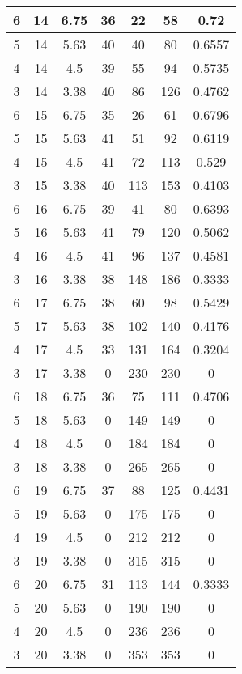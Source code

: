 \documentclass[letterpaper, 12pt]{article}
\begin{document}
\begin{longtable}{|c|c|c|c|c|c|c|}
6 & 14 & 6.75 & 36 & 22 & 58 & 0.72 \\
\hline
5 & 14 & 5.63 & 40 & 40 & 80 & 0.6557 \\
\hline
4 & 14 & 4.5 & 39 & 55 & 94 & 0.5735 \\
\hline
3 & 14 & 3.38 & 40 & 86 & 126 & 0.4762 \\
\hline
6 & 15 & 6.75 & 35 & 26 & 61 & 0.6796 \\
\hline
5 & 15 & 5.63 & 41 & 51 & 92 & 0.6119 \\
\hline
4 & 15 & 4.5 & 41 & 72 & 113 & 0.529 \\
\hline
3 & 15 & 3.38 & 40 & 113 & 153 & 0.4103 \\
\hline
6 & 16 & 6.75 & 39 & 41 & 80 & 0.6393 \\
\hline
5 & 16 & 5.63 & 41 & 79 & 120 & 0.5062 \\
\hline
4 & 16 & 4.5 & 41 & 96 & 137 & 0.4581 \\
\hline
3 & 16 & 3.38 & 38 & 148 & 186 & 0.3333 \\
\hline
6 & 17 & 6.75 & 38 & 60 & 98 & 0.5429 \\
\hline
5 & 17 & 5.63 & 38 & 102 & 140 & 0.4176 \\
\hline
4 & 17 & 4.5 & 33 & 131 & 164 & 0.3204 \\
\hline
3 & 17 & 3.38 & 0 & 230 & 230 & 0 \\
\hline
6 & 18 & 6.75 & 36 & 75 & 111 & 0.4706 \\
\hline
5 & 18 & 5.63 & 0 & 149 & 149 & 0 \\
\hline
4 & 18 & 4.5 & 0 & 184 & 184 & 0 \\
\hline
3 & 18 & 3.38 & 0 & 265 & 265 & 0 \\
\hline
6 & 19 & 6.75 & 37 & 88 & 125 & 0.4431 \\
\hline
5 & 19 & 5.63 & 0 & 175 & 175 & 0 \\
\hline
4 & 19 & 4.5 & 0 & 212 & 212 & 0 \\
\hline
3 & 19 & 3.38 & 0 & 315 & 315 & 0 \\
\hline
6 & 20 & 6.75 & 31 & 113 & 144 & 0.3333 \\
\hline
5 & 20 & 5.63 & 0 & 190 & 190 & 0 \\
\hline
4 & 20 & 4.5 & 0 & 236 & 236 & 0 \\
\hline
3 & 20 & 3.38 & 0 & 353 & 353 & 0 \\
\hline
\end{longtable}
\end{document}
